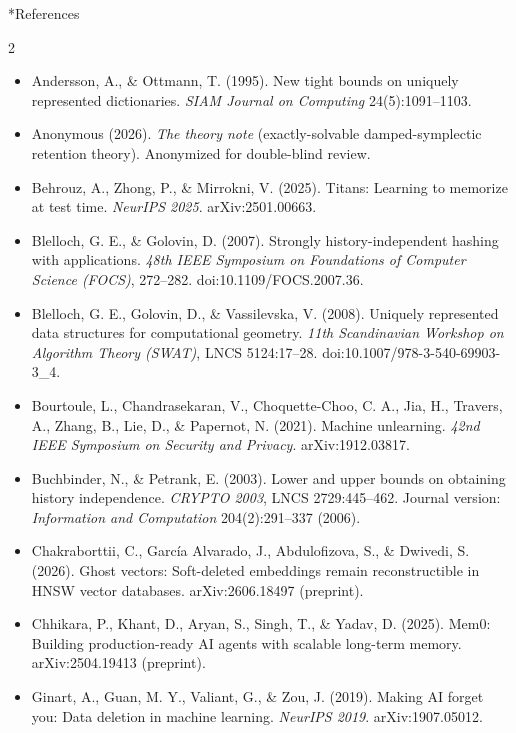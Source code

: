 \documentclass{article}
\makeatletter
\renewcommand\section{\@startsection{section}{1}{\z@}{-1.1ex plus -0.4ex minus -.2ex}{0.7ex plus .2ex}{\normalsize\bf\raggedright}}
\makeatother
\begin{document}
\section*{References}
{\tiny\setlength{\columnsep}{14pt}\begin{multicols}{2}\begin{itemize}\itemsep0pt \parskip0pt 
\item Andersson, A., \& Ottmann, T. (1995). New tight bounds on uniquely represented dictionaries. \emph{SIAM Journal on Computing} 24(5):1091--1103.
\item Anonymous (2026). \emph{The theory note} (exactly-solvable damped-symplectic retention theory). Anonymized for double-blind review.
\item Behrouz, A., Zhong, P., \& Mirrokni, V. (2025). Titans: Learning to memorize at test time. \emph{NeurIPS 2025}. arXiv:2501.00663.
\item Blelloch, G. E., \& Golovin, D. (2007). Strongly history-independent hashing with applications. \emph{48th IEEE Symposium on Foundations of Computer Science (FOCS)}, 272--282. doi:10.1109/FOCS.2007.36.
\item Blelloch, G. E., Golovin, D., \& Vassilevska, V. (2008). Uniquely represented data structures for computational geometry. \emph{11th Scandinavian Workshop on Algorithm Theory (SWAT)}, LNCS 5124:17--28. doi:10.1007/978-3-540-69903-3\_4.
\item Bourtoule, L., Chandrasekaran, V., Choquette-Choo, C. A., Jia, H., Travers, A., Zhang, B., Lie, D., \& Papernot, N. (2021). Machine unlearning. \emph{42nd IEEE Symposium on Security and Privacy}. arXiv:1912.03817.
\item Buchbinder, N., \& Petrank, E. (2003). Lower and upper bounds on obtaining history independence. \emph{CRYPTO 2003}, LNCS 2729:445--462. Journal version: \emph{Information and Computation} 204(2):291--337 (2006).
\item Chakraborttii, C., Garc\'ia Alvarado, J., Abdulofizova, S., \& Dwivedi, S. (2026). Ghost vectors: Soft-deleted embeddings remain reconstructible in HNSW vector databases. arXiv:2606.18497 (preprint).
\item Chhikara, P., Khant, D., Aryan, S., Singh, T., \& Yadav, D. (2025). Mem0: Building production-ready AI agents with scalable long-term memory. arXiv:2504.19413 (preprint).
\item Ginart, A., Guan, M. Y., Valiant, G., \& Zou, J. (2019). Making AI forget you: Data deletion in machine learning. \emph{NeurIPS 2019}. arXiv:1907.05012.

\end{itemize}
\end{multicols}}
\end{document}
